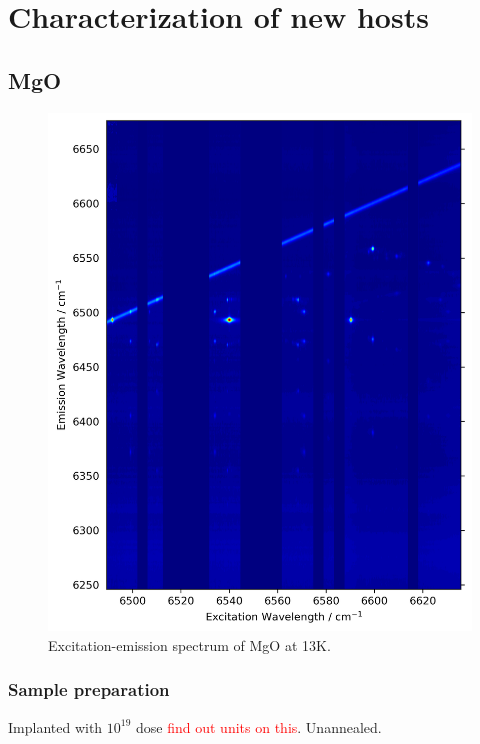\documentclass[12pt]{puthesis}
\newcommand{\notetoself}[1]{\textcolor{red}{#1}}
\begin{document}

\chapter{Characterization of new hosts}


\section{MgO}
\label{sec:mgo}

\begin{figure}[t]
  \centering
  \includegraphics[scale=1]{JinD_spectrum_13K}
  \caption{Excitation-emission spectrum of MgO at 13K.}
  \label{fig:mgospectrum}
\end{figure}

\subsection{Sample preparation}
Implanted with $10^{19}$ dose \notetoself{find out units on this}. Unannealed.
\end{document}
